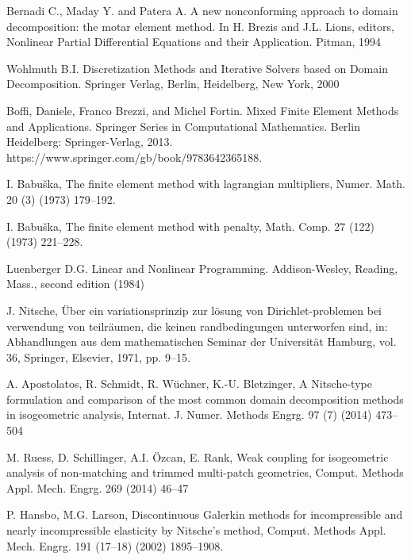 \documentclass{article}
\begin{document}
\begin{thebibliography}{99}
 Bernadi C., Maday Y. and Patera A. A new nonconforming approach to
domain decomposition: the motar element method. In H. Brezis and J.L.
Lions, editors, Nonlinear Partial Differential Equations and their Application.
Pitman, 1994

 Wohlmuth B.I. Discretization Methods and Iterative Solvers based on Domain Decomposition. Springer Verlag, Berlin, Heidelberg, New York, 2000

 Boffi, Daniele, Franco Brezzi, and Michel Fortin. Mixed Finite Element Methods and Applications. Springer Series in Computational Mathematics. Berlin Heidelberg: Springer-Verlag, 2013. https://www.springer.com/gb/book/9783642365188.

 I. Babuška, The finite element method with lagrangian multipliers, Numer. Math. 20 (3) (1973) 179–192.

 I. Babuška, The finite element method with penalty, Math. Comp. 27 (122) (1973) 221–228.

 Luenberger D.G. Linear and Nonlinear Programming. Addison-Wesley, Reading, Mass., second edition (1984)

 J. Nitsche, Über ein variationsprinzip zur lösung von Dirichlet-problemen bei verwendung von teilräumen, die keinen randbedingungen
unterworfen sind, in: Abhandlungen aus dem mathematischen Seminar der Universität Hamburg, vol. 36, Springer, Elsevier, 1971, pp. 9–15.

 A. Apostolatos, R. Schmidt, R. Wüchner, K.-U. Bletzinger, A Nitsche-type formulation and comparison of the most common domain
decomposition methods in isogeometric analysis, Internat. J. Numer. Methods Engrg. 97 (7) (2014) 473–504

 M. Ruess, D. Schillinger, A.I. Özcan, E. Rank, Weak coupling for isogeometric analysis of non-matching and trimmed multi-patch
geometries, Comput. Methods Appl. Mech. Engrg. 269 (2014) 46–47

 P. Hansbo, M.G. Larson, Discontinuous Galerkin methods for incompressible and nearly incompressible elasticity by Nitsche’s method,
Comput. Methods Appl. Mech. Engrg. 191 (17–18) (2002) 1895–1908.

 
\end{thebibliography}
 
\end{document}
